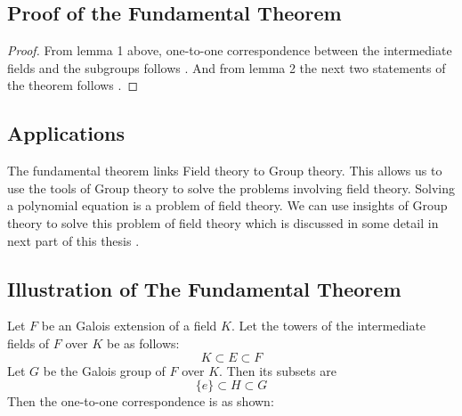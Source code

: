 \subsection{Proof of the Fundamental Theorem}
\begin{proof}
From lemma 1 above, one-to-one correspondence between the intermediate fields and the subgroups follows \cite{hunger}. And from lemma 2 the next two statements of the theorem follows \cite{hunger}.
\end{proof}
\vspace{3mm}

\subsection{Applications}
The fundamental theorem links Field theory to Group theory. This allows us to use the tools of Group theory to solve the problems involving field theory. Solving a polynomial equation is a problem of field theory. We can use insights of Group theory to solve this problem of field theory which is discussed in some detail in next part of this thesis \cite{hunger}.


\subsection{Illustration of The Fundamental Theorem}
\begin{minipage}{0.68\textwidth}
  Let \(F\) be an Galois extension of a field \(K\). Let the towers of the intermediate fields of \(F\) over \(K\) be as follows:
  \[
    K \subset E \subset F
  \]
\noindent
  Let \(G\) be the Galois group of \(F\) over \(K\). Then its subsets are
  \[
    \{e\} \subset H \subset G
  \]
  Then the one-to-one correspondence is as shown:
\end{minipage}\hspace{2mm}
\begin{minipage}{0.3\textwidth}

  \begin{tcolorbox}[colback=gray!20, colframe=blue!20, title={\footnotesize \textcolor{black}{Galois-correspondence}}, width=5cm]
  \end{tcolorbox}
\end{minipage}

